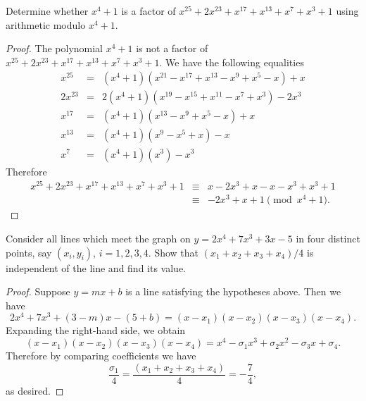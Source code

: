 \documentclass[10pt]{amsart}
\begin{document}
\begin{thm}\label{ex1}
  Determine whether $x^4 + 1$ is a factor of $x^{25} + 2x^{23} + x^{17} + x^{13} + x^7 + x^3 + 1$ using arithmetic modulo $x^4 + 1$.
  
  \begin{proof}
    The polynomial $x^4 + 1$ is not a factor of $x^{25} + 2x^{23} + x^{17} + x^{13} + x^7 + x^3 + 1$.
    We have the following equalities
    \begin{eqnarray*}
      x^{25} &=& (x^4 + 1)(x^{21} - x^{17} + x^{13} - x^9 + x^5 - x) + x\\
      2x^{23} &=& 2(x^4 + 1)(x^{19} - x^{15} + x^{11} - x^7 + x^3) - 2x^3\\
      x^{17} &=& (x^4 + 1)(x^{13} - x^9 + x^5 - x) + x\\
      x^{13} &=& (x^4 + 1)(x^9 - x^5 + x) - x\\
      x^7 &=& (x^4 + 1)(x^3) - x^3
    \end{eqnarray*}
    Therefore 
    \begin{eqnarray*}
      x^{25} + 2x^{23} + x^17 + x^13 + x^7 + x^3 + 1 &\equiv& x - 2x^3 + x - x - x^3 + x^3 + 1\\
      &\equiv& -2x^3 + x + 1 \pmod{x^4 + 1}.
    \end{eqnarray*}
  \end{proof}
\end{thm}

\begin{thm}\label{ex1}
  Consider all lines which meet the graph on $y = 2x^4 + 7x^3 + 3x - 5$ in four distinct points, say $(x_i, y_i)$, $i = 1, 2, 3, 4$.
  Show that $(x_1 + x_2 + x_3 + x_4)/4$ is independent of the line and find its value.
  
  \begin{proof}
    Suppose $y = mx + b$ is a line satisfying the hypotheses above.
    Then we have
    $$2x^4 + 7x^3 + (3 - m)x - (5 + b) = (x - x_1)(x - x_2)(x - x_3)(x - x_4).$$ 
    Expanding the right-hand side, we obtain
    $$(x - x_1)(x - x_2)(x - x_3)(x - x_4) = x^4 - \sigma_1 x^3 + \sigma_2 x^2 - \sigma_3 x + \sigma_4.$$
    Therefore by comparing coefficients we have
    $$\frac{\sigma_1}{4} = \frac{(x_1 + x_2 + x_3 + x_4)}{4} = -\frac{7}{4},$$
    as desired.
  \end{proof}
\end{thm}
\end{document}
